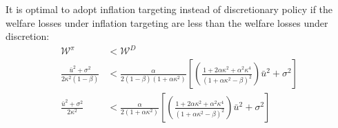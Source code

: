\documentclass[11pt]{article} %
\begin{document}
It is optimal to adopt inflation targeting instead of discretionary policy if the welfare losses under inflation targeting are less than the welfare losses under discretion:
\begin{align*}
\mathcal{W}^{\pi} &< \mathcal{W}^{D} \\
\frac{\bar{u}^2 + \sigma^2}{2\kappa^2(1-\beta)}&< \frac{\alpha}{2(1-\beta)(1+\alpha\kappa^2)} \left[\left(   \frac{1 + 2\alpha\kappa^2 + \alpha^2\kappa^4 }{(1+\alpha\kappa^2 - \beta)^2} \right)\bar{u}^2 + \sigma^2 \right]\\
\frac{\bar{u}^2 + \sigma^2}{2\kappa^2}&< \frac{\alpha}{2(1+\alpha\kappa^2)} \left[\left(   \frac{1 + 2\alpha\kappa^2 + \alpha^2\kappa^4 }{(1+\alpha\kappa^2 - \beta)^2} \right)\bar{u}^2 + \sigma^2 \right]
\end{align*}
\end{document}
